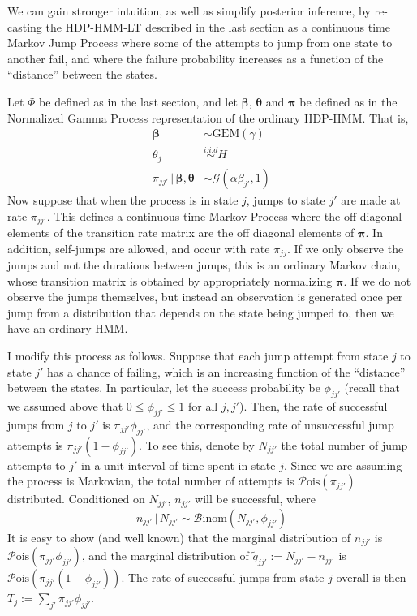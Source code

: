 \documentclass[12pt,letterpaper]{report}
\newcommand{\Pois}[1]{\mathcal{P}\mathrm{ois}(#1)}
\newcommand{\Gamm}[2]{\mathcal{G}(#1,#2)}
\newcommand{\Binom}[2]{\mathcal{B}\mathrm{inom}(#1,#2)}
\newcommand{\given}{\, \vert \,}
\newcommand{\bbeta}{\boldsymbol{\beta}}
\newcommand{\btheta}{\boldsymbol{\theta}}
\newcommand{\bpi}{\boldsymbol{\pi}}
\begin{document}
We can gain stronger intuition, as well as simplify posterior
inference, by re-casting the HDP-HMM-LT described in the last section
as a continuous time Markov Jump Process where some of the attempts to jump
from one state to another fail, and where the failure probability
increases as a function of the ``distance'' between the states.

Let $\Phi$ be defined as in the last section, and let 
$\bbeta$, $\btheta$ and $\bpi$ be defined as in the Normalized Gamma
Process representation of the ordinary HDP-HMM.  That is,
\begin{align}
  \label{eq:beta} \bbeta &\sim \mathrm{GEM}(\gamma) \\
  \theta_j &\stackrel{i.i.d}{\sim} H \\
  \pi_{jj'} \given \bbeta, \btheta &\sim \Gamm{\alpha \beta_{j'}}{1}
\end{align}
Now suppose that when the process is in state $j$, jumps to state
$j'$ are made at rate $\pi_{jj'}$.  This defines a continuous-time
Markov Process where the off-diagonal elements of the transition rate
matrix are the off diagonal elements of $\bpi$.  In addition,
self-jumps are allowed, and occur with rate $\pi_{jj}$.   If we only
observe the jumps and not the durations between jumps, this is an
ordinary Markov chain, whose transition matrix is obtained by
appropriately normalizing $\bpi$.  If we do not observe the jumps themselves, but
instead an observation is generated once per jump from a distribution that depends
on the state being jumped to, then we have an ordinary HMM.

I modify this process as follows.  
Suppose that each jump attempt from state $j$ to state $j'$ has a
chance of failing, which is an increasing function of the ``distance''
between the states.  In particular, let the success probability be
$\phi_{jj'}$ (recall that we assumed above that $0 \leq \phi_{jj'}
\leq 1$ for all $j,j'$).  Then, the rate of successful jumps from $j$
to $j'$ is $\pi_{jj'}\phi_{jj'}$, and the corresponding rate of unsuccessful jump
attempts is $\pi_{jj'}(1-\phi_{jj'})$.  To see this, denote by
$N_{jj'}$ the total number of jump attempts to $j'$ in a unit
interval of time spent in state $j$.  Since we are assuming the
process is Markovian, the total number of attempts is $\Pois{\pi_{jj'}}$
distributed.  Conditioned on $N_{jj'}$, $n_{jj'}$ will be successful, where
\begin{equation}
  \label{eq:51}
  n_{jj'} \given N_{jj'} \sim \Binom{N_{jj'}}{\phi_{jj'}}
\end{equation}
It is easy to show (and well known) that the marginal distribution of
$n_{jj'}$ is $\Pois{\pi_{jj'}\phi_{jj'}}$, and the marginal
distribution of $\tilde{q}_{jj'} := N_{jj'} - n_{jj'}$ is
$\Pois{\pi_{jj'}(1-\phi_{jj'})}$.  The rate of successful jumps
from state $j$ overall is then $T_j := \sum_{j'} \pi_{jj'} \phi_{jj'}$.
\end{document}
